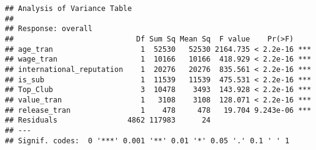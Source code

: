 \documentclass[
]{article}
\begin{document}
\begin{verbatim}
## Analysis of Variance Table
## 
## Response: overall
##                            Df Sum Sq Mean Sq  F value    Pr(>F)    
## age_tran                    1  52530   52530 2164.735 < 2.2e-16 ***
## wage_tran                   1  10166   10166  418.929 < 2.2e-16 ***
## international_reputation    1  20276   20276  835.561 < 2.2e-16 ***
## is_sub                      1  11539   11539  475.531 < 2.2e-16 ***
## Top_Club                    3  10478    3493  143.928 < 2.2e-16 ***
## value_tran                  1   3108    3108  128.071 < 2.2e-16 ***
## release_tran                1    478     478   19.704 9.243e-06 ***
## Residuals                4862 117983      24                       
## ---
## Signif. codes:  0 '***' 0.001 '**' 0.01 '*' 0.05 '.' 0.1 ' ' 1
\end{verbatim}
\end{document}

